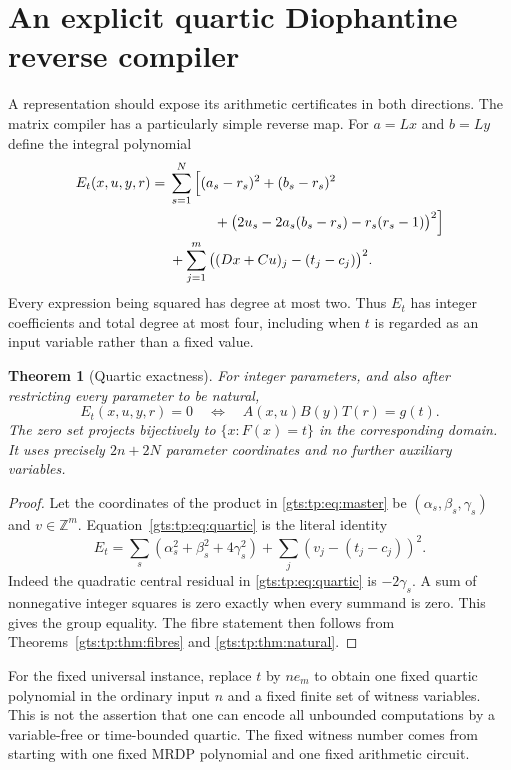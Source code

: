 \documentclass[11pt,letterpaper]{article}
\newtheorem{theorem}{Theorem}[section]
\theoremstyle{definition}
\theoremstyle{remark}
\newcommand{\ZZ}{\mathbb Z}
\begin{document}
\section{An explicit quartic Diophantine reverse compiler}
\label{gts:tp:sec:quartic}

A representation should expose its arithmetic certificates in both
directions. The matrix compiler has a particularly simple reverse map.
For $a=Lx$ and $b=Ly$ define the integral polynomial
\begin{align}
 E_t(x,u,y,r)
 ={}&\sum_{s=1}^N\Big[(a_s-r_s)^2+(b_s-r_s)^2\notag\\
 &\hspace{3.2em}
 +\big(2u_s-2a_s(b_s-r_s)-r_s(r_s-1)\big)^2\Big]\notag\\
 &+\sum_{j=1}^m\big((Dx+Cu)_j-(t_j-c_j)\big)^2.
 \label{gts:tp:eq:quartic}
\end{align}
Every expression being squared has degree at most two. Thus $E_t$ has
integer coefficients and total degree at most four, including when $t$
is regarded as an input variable rather than a fixed value.

\begin{theorem}[Quartic exactness]\label{gts:tp:thm:quartic}
For integer parameters, and also after restricting every parameter to be
natural,
\[
 E_t(x,u,y,r)=0
 \quad\Longleftrightarrow\quad
 A(x,u)B(y)T(r)=g(t).
\]
The zero set projects bijectively to $\{x:F(x)=t\}$ in the corresponding
domain. It uses precisely $2n+2N$ parameter coordinates and no further
auxiliary variables.
\end{theorem}
\begin{proof}
Let the coordinates of the product in \eqref{gts:tp:eq:master} be $(\alpha_s,
\beta_s,\gamma_s)$ and $v\in\ZZ^m$. Equation~\eqref{gts:tp:eq:quartic} is the
literal identity
\begin{equation}\label{gts:tp:eq:offzero}
 E_t=\sum_s(\alpha_s^2+\beta_s^2+4\gamma_s^2)
                     +\sum_j(v_j-(t_j-c_j))^2.
\end{equation}
Indeed the quadratic central residual in \eqref{gts:tp:eq:quartic} is
$-2\gamma_s$. A sum of nonnegative integer squares is zero exactly when
every summand is zero. This gives the group equality. The fibre statement
then follows from Theorems~\ref{gts:tp:thm:fibres} and \ref{gts:tp:thm:natural}.
\end{proof}

For the fixed universal instance, replace $t$ by $ne_m$ to obtain one fixed
quartic polynomial in the ordinary input $n$ and a fixed finite set of
witness variables. This is not the assertion that one can encode all
unbounded computations by a variable-free or time-bounded quartic. The
fixed witness number comes from starting with one fixed MRDP polynomial
and one fixed arithmetic circuit.
\end{document}
